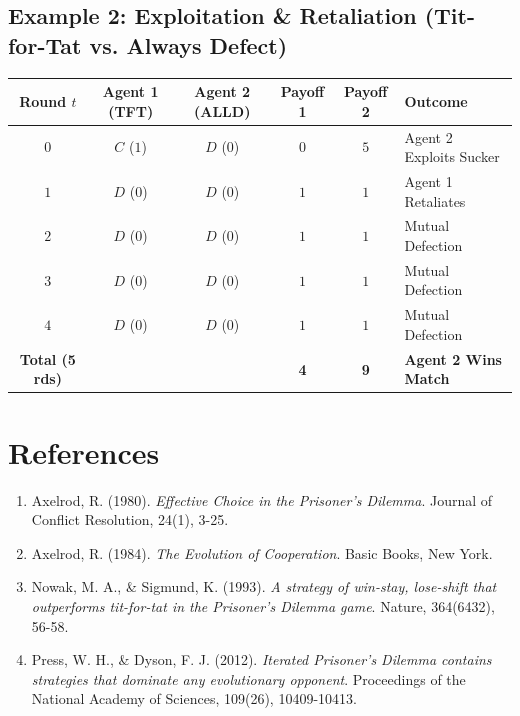 ﻿\documentclass[11pt,a4paper]{article}
\begin{document}
\subsection{Example 2: Exploitation & Retaliation (Tit-for-Tat vs. Always Defect)}
\begin{center}
\small
\begin{tabularx}{\textwidth}{cccccX}
\toprule
\textbf{Round} $t$ & \textbf{Agent 1 (TFT)} & \textbf{Agent 2 (ALLD)} & \textbf{Payoff 1} & \textbf{Payoff 2} & \textbf{Outcome} \\
\midrule
$0$ & $C$ ($1$) & $D$ ($0$) & $0$ & $5$ & Agent 2 Exploits Sucker \\
$1$ & $D$ ($0$) & $D$ ($0$) & $1$ & $1$ & Agent 1 Retaliates \\
$2$ & $D$ ($0$) & $D$ ($0$) & $1$ & $1$ & Mutual Defection \\
$3$ & $D$ ($0$) & $D$ ($0$) & $1$ & $1$ & Mutual Defection \\
$4$ & $D$ ($0$) & $D$ ($0$) & $1$ & $1$ & Mutual Defection \\
\midrule
\textbf{Total (5 rds)} & & & \textbf{4} & \textbf{9} & \textbf{Agent 2 Wins Match} \\
\bottomrule
\end{tabularx}
\end{center}


\section{References}

\begin{enumerate}
    \item Axelrod, R. (1980). \textit{Effective Choice in the Prisoner's Dilemma}. Journal of Conflict Resolution, 24(1), 3-25.
    \item Axelrod, R. (1984). \textit{The Evolution of Cooperation}. Basic Books, New York.
    \item Nowak, M. A., \& Sigmund, K. (1993). \textit{A strategy of win-stay, lose-shift that outperforms tit-for-tat in the Prisoner's Dilemma game}. Nature, 364(6432), 56-58.
    \item Press, W. H., \& Dyson, F. J. (2012). \textit{Iterated Prisoner's Dilemma contains strategies that dominate any evolutionary opponent}. Proceedings of the National Academy of Sciences, 109(26), 10409-10413.
\end{enumerate}
\end{document}
